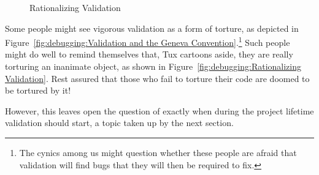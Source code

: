 \begin{figure}[tb]
\centering
{}
\caption{Rationalizing Validation}
\end{figure}

Some people might see vigorous validation as a form of torture, as
depicted in
Figure~\ref{fig:debugging:Validation and the Geneva Convention}.\footnote{
	The cynics among us might question whether these people are
	afraid that validation will find bugs that they will then be
	required to fix.}
Such people might do well to remind themselves that, Tux cartoons aside,
they are really torturing an inanimate object, as shown in
Figure~\ref{fig:debugging:Rationalizing Validation}.
Rest assured that those who fail to torture their code are doomed to be
tortured by it!

However, this leaves open the question of exactly when during the project
lifetime validation should start, a topic taken up by the next section.

